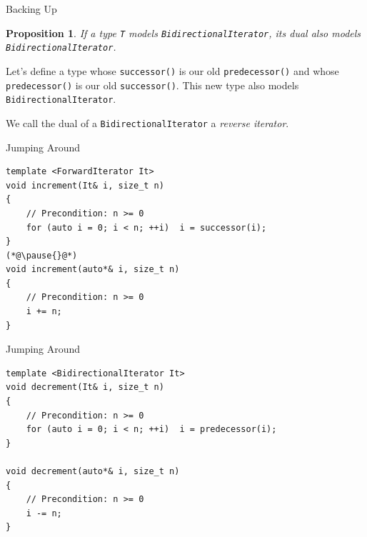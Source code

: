 \documentclass[aspectratio=169]{beamer}
\newtheorem{claim}{Proposition}
\begin{document}
\begin{frame}[fragile]{Backing Up}
  \begin{claim}
    If a type \texttt{T} models \texttt{BidirectionalIterator}, its
    dual also models \texttt{BidirectionalIterator}.
  \end{claim}
  \pause{}
  \begin{center}
    Let's define a type whose \texttt{successor()} is our old
    \texttt{predecessor()} and whose \texttt{predecessor()} is our old
    \texttt{successor()}.  This new type also models
    \texttt{BidirectionalIterator}.
  \end{center}
  \pause
  \begin{center}
    We call the dual of a \texttt{BidirectionalIterator} a
    \textit{reverse iterator}.
  \end{center}
\end{frame}


\begin{frame}[fragile]{Jumping Around}
  \pause{}
  \small
\begin{lstlisting}
template <ForwardIterator It>
void increment(It& i, size_t n)
{
    // Precondition: n >= 0
    for (auto i = 0; i < n; ++i)  i = successor(i);
}
(*@\pause{}@*)
void increment(auto*& i, size_t n)
{
    // Precondition: n >= 0
    i += n;
}
\end{lstlisting}
\end{frame}


\begin{frame}[fragile]{Jumping Around}
  \small
\begin{lstlisting}
template <BidirectionalIterator It>
void decrement(It& i, size_t n)
{
    // Precondition: n >= 0
    for (auto i = 0; i < n; ++i)  i = predecessor(i);
}

void decrement(auto*& i, size_t n)
{
    // Precondition: n >= 0
    i -= n;
}
\end{lstlisting}
\end{frame}

\end{document}
